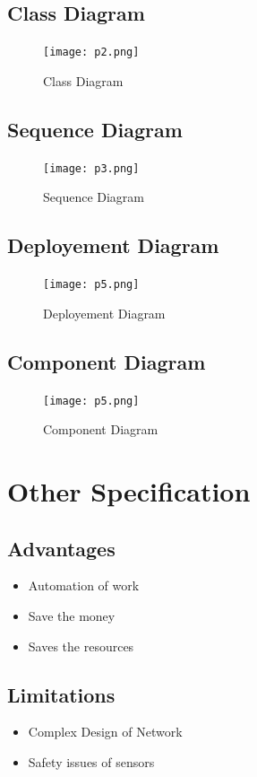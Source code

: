 \documentclass[a4paper,12pt]{report}
\begin{document}
\section{Class Diagram}
\begin{figure}[H]
  \texttt{[image: p2.png]}
  \caption{Class Diagram}
  \label{fig:boat1}
\end{figure}

\section{Sequence Diagram}
\begin{figure}[H]
  \texttt{[image: p3.png]}
  \caption{Sequence Diagram}
  \label{fig:boat1}
\end{figure}

\section{Deployement Diagram}
\begin{figure}[H]
  \texttt{[image: p5.png]}
  \caption{Deployement Diagram}
  \label{fig:boat1}
\end{figure}

\section{Component Diagram}
\begin{figure}[H]
  \texttt{[image: p5.png]}
  \caption{Component Diagram}
  \label{fig:boat1}
\end{figure}

\chapter {Other Specification}
\section{Advantages}
\begin{itemize}
\item Automation of work
\item  Save the money
\item  Saves the resources
\end{itemize}


\section{Limitations}
\begin{itemize}
\item  Complex Design of Network
\item  Safety issues of sensors
\end{itemize}
\end{document}
